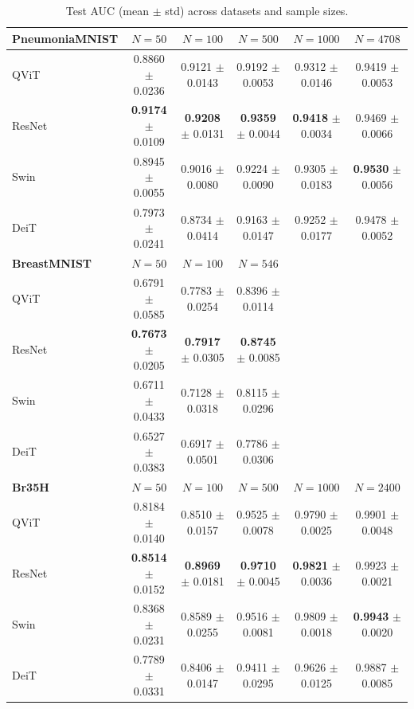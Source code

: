 \begin{table}[htbp]
\centering
\caption{Test AUC (mean $\pm$ std) across datasets and sample sizes.}
\label{tab:test_auc}
\begin{tabular}{lccccc}
\toprule
\textbf{PneumoniaMNIST} & $N = 50$ & $N = 100$ & $N = 500$ & $N = 1000$ & $N = 4708$ \\
\midrule
QViT & 0.8860 $\pm$ 0.0236 & 0.9121 $\pm$ 0.0143 & 0.9192 $\pm$ 0.0053 & 0.9312 $\pm$ 0.0146 & 0.9419 $\pm$ 0.0053 \\
ResNet & \textbf{0.9174} $\pm$ 0.0109 & \textbf{0.9208} $\pm$ 0.0131 & \textbf{0.9359} $\pm$ 0.0044 & \textbf{0.9418} $\pm$ 0.0034 & 0.9469 $\pm$ 0.0066 \\
Swin & 0.8945 $\pm$ 0.0055 & 0.9016 $\pm$ 0.0080 & 0.9224 $\pm$ 0.0090 & 0.9305 $\pm$ 0.0183 & \textbf{0.9530} $\pm$ 0.0056 \\
DeiT & 0.7973 $\pm$ 0.0241 & 0.8734 $\pm$ 0.0414 & 0.9163 $\pm$ 0.0147 & 0.9252 $\pm$ 0.0177 & 0.9478 $\pm$ 0.0052 \\
\midrule
\textbf{BreastMNIST} & $N = 50$ & $N = 100$ & $N = 546$ &  &  \\
\midrule
QViT & 0.6791 $\pm$ 0.0585 & 0.7783 $\pm$ 0.0254 & 0.8396 $\pm$ 0.0114 &  &  \\
ResNet & \textbf{0.7673} $\pm$ 0.0205 & \textbf{0.7917} $\pm$ 0.0305 & \textbf{0.8745} $\pm$ 0.0085 &  &  \\
Swin & 0.6711 $\pm$ 0.0433 & 0.7128 $\pm$ 0.0318 & 0.8115 $\pm$ 0.0296 &  &  \\
DeiT & 0.6527 $\pm$ 0.0383 & 0.6917 $\pm$ 0.0501 & 0.7786 $\pm$ 0.0306 &  &  \\
\midrule
\textbf{Br35H} & $N = 50$ & $N = 100$ & $N = 500$ & $N = 1000$ & $N = 2400$ \\
\midrule
QViT & 0.8184 $\pm$ 0.0140 & 0.8510 $\pm$ 0.0157 & 0.9525 $\pm$ 0.0078 & 0.9790 $\pm$ 0.0025 & 0.9901 $\pm$ 0.0048 \\
ResNet & \textbf{0.8514} $\pm$ 0.0152 & \textbf{0.8969} $\pm$ 0.0181 & \textbf{0.9710} $\pm$ 0.0045 & \textbf{0.9821} $\pm$ 0.0036 & 0.9923 $\pm$ 0.0021 \\
Swin & 0.8368 $\pm$ 0.0231 & 0.8589 $\pm$ 0.0255 & 0.9516 $\pm$ 0.0081 & 0.9809 $\pm$ 0.0018 & \textbf{0.9943} $\pm$ 0.0020 \\
DeiT & 0.7789 $\pm$ 0.0331 & 0.8406 $\pm$ 0.0147 & 0.9411 $\pm$ 0.0295 & 0.9626 $\pm$ 0.0125 & 0.9887 $\pm$ 0.0085 \\
\bottomrule
\end{tabular}
\end{table}
